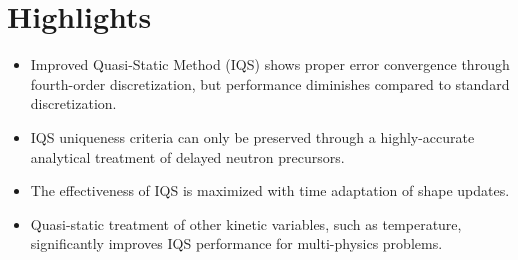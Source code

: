 \documentclass{elsarticle}
\begin{document}
\section*{Highlights}

\begin{itemize}
\item Improved Quasi-Static Method (IQS) shows proper error convergence through fourth-order discretization, but performance diminishes compared to standard discretization.
\item IQS uniqueness criteria can only be preserved through a highly-accurate analytical treatment of delayed neutron precursors.
\item The effectiveness of IQS is maximized with time adaptation of shape updates.
\item Quasi-static treatment of other kinetic variables, such as temperature, significantly improves IQS performance for multi-physics problems.
\end{itemize}
\end{document}
